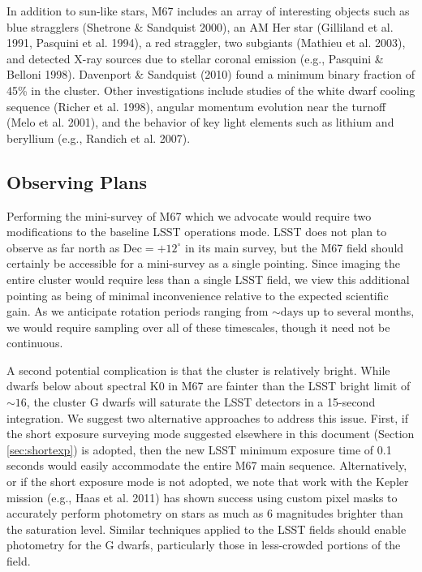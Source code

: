 In addition to sun-like stars, M67 includes an array of interesting
objects such as blue stragglers (Shetrone \& Sandquist 2000), an AM
Her star (Gilliland et al. 1991, Pasquini et al. 1994), a red straggler,
two subgiants (Mathieu et al. 2003), and detected X-ray sources due
to stellar coronal emission (e.g., Pasquini \& Belloni 1998). Davenport
\& Sandquist (2010) found a minimum binary fraction of 45\% in the
cluster. Other investigations include studies of the white dwarf cooling
sequence (Richer et al. 1998), angular momentum evolution near the
turnoff (Melo et al. 2001), and the behavior of key light elements
such as lithium and beryllium (e.g., Randich et al. 2007).


\subsection{Observing Plans }

Performing the mini-survey of M67 which we advocate would require
two modifications to the baseline LSST operations mode. LSST does
not plan to observe as far north as $\mathrm{Dec}=+12^{\circ}$ in
its main survey, but the M67 field should certainly be accessible
for a mini-survey as a single pointing. Since imaging the entire cluster
would require less than a single LSST field, we view this additional
pointing as being of minimal inconvenience relative to the expected
scientific gain. As we anticipate rotation periods ranging from $\sim\mathrm{days}$
up to several months, we would require sampling over all of these
timescales, though it need not be continuous.

A second potential complication is that the cluster is relatively
bright. While dwarfs below about spectral K0 in M67 are fainter than
the LSST bright limit of $\sim16$, the cluster G dwarfs will saturate
the LSST detectors in a 15-second integration. We suggest two alternative
approaches to address this issue. First, if the short exposure surveying mode
suggested elsewhere in this document (Section \ref{sec:shortexp}) is adopted,
then the new LSST minimum exposure time of 0.1 seconds would easily
accommodate the entire M67 main sequence. Alternatively, or if the
short exposure mode is not adopted, we note that work with the Kepler
mission (e.g., Haas et al. 2011) has shown success using custom pixel
masks to accurately perform photometry on stars as much as 6 magnitudes
brighter than the saturation level. Similar techniques applied to
the LSST fields should enable photometry for the G dwarfs, particularly
those in less-crowded portions of the field.


